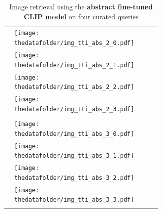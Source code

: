 \documentclass[10pt]{article} %
\begin{document}
\begin{table}[h!]
\begin{tabular}{m{3cm} p{3cm} p{3cm} p{3cm} p{3cm}}
      \texttt{} \vspace{20mm} & \centering \texttt{[image: \\thedatafolder/img\_tti\_abs\_2\_0.pdf]} \\  & \centering \texttt{[image: \\thedatafolder/img\_tti\_abs\_2\_1.pdf]} \\  & \centering \texttt{[image: \\thedatafolder/img\_tti\_abs\_2\_2.pdf]} \\  & \centering \texttt{[image: \\thedatafolder/img\_tti\_abs\_2\_3.pdf]} \\   \tabularnewline
      \midrule
      \texttt{} \vspace{20mm} & \centering \texttt{[image: \\thedatafolder/img\_tti\_abs\_3\_0.pdf]} \\  & \centering \texttt{[image: \\thedatafolder/img\_tti\_abs\_3\_1.pdf]} \\  & \centering \texttt{[image: \\thedatafolder/img\_tti\_abs\_3\_2.pdf]} \\  & \centering \texttt{[image: \\thedatafolder/img\_tti\_abs\_3\_3.pdf]} \\   \tabularnewline
      \bottomrule
  \end{tabular}
  \caption{Image retrieval using the \textbf{\textcolor{deepblue}{abstract fine-tuned CLIP model}} on four curated queries}
  \label{tab:tti_abs}
\end{table}
\end{document}
